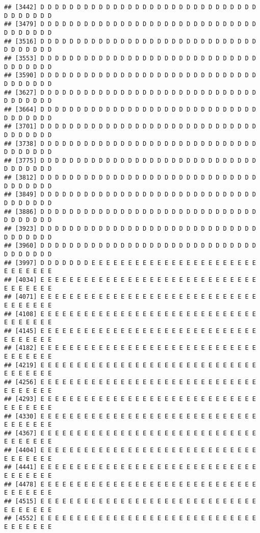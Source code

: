\documentclass[]{article}
\begin{document}
\begin{verbatim}
## [3442] D D D D D D D D D D D D D D D D D D D D D D D D D D D D D D D D D D D D D
## [3479] D D D D D D D D D D D D D D D D D D D D D D D D D D D D D D D D D D D D D
## [3516] D D D D D D D D D D D D D D D D D D D D D D D D D D D D D D D D D D D D D
## [3553] D D D D D D D D D D D D D D D D D D D D D D D D D D D D D D D D D D D D D
## [3590] D D D D D D D D D D D D D D D D D D D D D D D D D D D D D D D D D D D D D
## [3627] D D D D D D D D D D D D D D D D D D D D D D D D D D D D D D D D D D D D D
## [3664] D D D D D D D D D D D D D D D D D D D D D D D D D D D D D D D D D D D D D
## [3701] D D D D D D D D D D D D D D D D D D D D D D D D D D D D D D D D D D D D D
## [3738] D D D D D D D D D D D D D D D D D D D D D D D D D D D D D D D D D D D D D
## [3775] D D D D D D D D D D D D D D D D D D D D D D D D D D D D D D D D D D D D D
## [3812] D D D D D D D D D D D D D D D D D D D D D D D D D D D D D D D D D D D D D
## [3849] D D D D D D D D D D D D D D D D D D D D D D D D D D D D D D D D D D D D D
## [3886] D D D D D D D D D D D D D D D D D D D D D D D D D D D D D D D D D D D D D
## [3923] D D D D D D D D D D D D D D D D D D D D D D D D D D D D D D D D D D D D D
## [3960] D D D D D D D D D D D D D D D D D D D D D D D D D D D D D D D D D D D D D
## [3997] D D D D D D D E E E E E E E E E E E E E E E E E E E E E E E E E E E E E E
## [4034] E E E E E E E E E E E E E E E E E E E E E E E E E E E E E E E E E E E E E
## [4071] E E E E E E E E E E E E E E E E E E E E E E E E E E E E E E E E E E E E E
## [4108] E E E E E E E E E E E E E E E E E E E E E E E E E E E E E E E E E E E E E
## [4145] E E E E E E E E E E E E E E E E E E E E E E E E E E E E E E E E E E E E E
## [4182] E E E E E E E E E E E E E E E E E E E E E E E E E E E E E E E E E E E E E
## [4219] E E E E E E E E E E E E E E E E E E E E E E E E E E E E E E E E E E E E E
## [4256] E E E E E E E E E E E E E E E E E E E E E E E E E E E E E E E E E E E E E
## [4293] E E E E E E E E E E E E E E E E E E E E E E E E E E E E E E E E E E E E E
## [4330] E E E E E E E E E E E E E E E E E E E E E E E E E E E E E E E E E E E E E
## [4367] E E E E E E E E E E E E E E E E E E E E E E E E E E E E E E E E E E E E E
## [4404] E E E E E E E E E E E E E E E E E E E E E E E E E E E E E E E E E E E E E
## [4441] E E E E E E E E E E E E E E E E E E E E E E E E E E E E E E E E E E E E E
## [4478] E E E E E E E E E E E E E E E E E E E E E E E E E E E E E E E E E E E E E
## [4515] E E E E E E E E E E E E E E E E E E E E E E E E E E E E E E E E E E E E E
## [4552] E E E E E E E E E E E E E E E E E E E E E E E E E E E E E E E E E E E E E

\end{verbatim}
\end{document}
